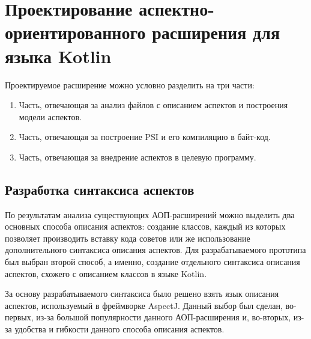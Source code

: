 \chapter{Проектирование аспектно-ориентированного расширения для языка Kotlin}
\label{cha:extension_design}
Проектируемое расширение можно условно разделить на три части:
\begin{enumerate}
	\item Часть, отвечающая за анализ файлов с описанием аспектов и построения
		модели аспектов.
	\item Часть, отвечающая за построение PSI и его компиляцию в байт-код.
	\item Часть, отвечающая за внедрение аспектов в целевую программу.
\end{enumerate}
\section{Разработка синтаксиса аспектов}
\label{sec:aspect_syntax_design}
По результатам анализа существующих АОП-расширений можно выделить два основных
способа описания аспектов: создание классов, каждый из которых позволяет
производить вставку кода советов или же использование дополнительного синтаксиса
описания аспектов.
Для разрабатываемого прототипа был выбран второй способ, а именно, создание
отдельного синтаксиса описания аспектов, схожего с описанием классов в языке
Kotlin.

За основу разрабатываемого синтаксиса было решено взять язык описания аспектов,
используемый в фреймворке AspectJ.
Данный выбор был сделан, во-первых, из-за большой популярности данного
АОП-расширения и, во-вторых, из-за удобства и гибкости данного способа описания
аспектов.
